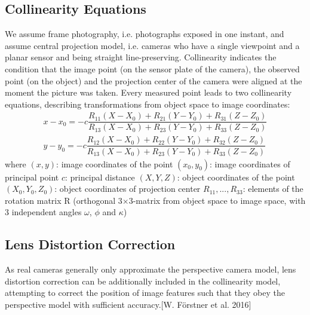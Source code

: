 \subsection{Collinearity Equations}
\label{subsec:Collinearity}
We assume frame photography, i.e. photographs exposed in one instant, and assume central projection model, i.e. cameras who have a single viewpoint and a planar sensor and being straight line-preserving. Collinearity indicates the condition that the image point (on the sensor plate of the camera), the observed point (on the object) and the projection center of the camera were aligned at the moment the picture was taken. Every measured point leads to two collinearity equations, describing transformations from object space to image coordinates:
\begin{equation} \label{eq:collinearity}
\begin{split}
x - x_0 = -c \dfrac {R_{11}(X-X_0) + R_{21}(Y-Y_0) + R_{31}(Z-Z_0)} {R_{13}(X-X_0) + R_{23}(Y-Y_0) + R_{33}(Z-Z_0)} \\
y - y_0 = -c \dfrac {R_{12}(X-X_0) + R_{22}(Y-Y_0) + R_{32}(Z-Z_0)} {R_{13}(X-X_0) + R_{23}(Y-Y_0) + R_{33}(Z-Z_0)}
\end{split}
\end{equation}
where\newline
$(x, y)$: image coordinates of the point \newline
$(x_0, y_0)$: image coordinates of principal point \newline
$c$: principal distance \newline
$(X, Y, Z)$: object coordinates of the point \newline
$(X_0, Y_0, Z_0)$: object coordinates of projection center \newline
$R_{11},...,R_{33}$: elements of the rotation matrix R (orthogonal 3$\times$3-matrix from object space to image space, with 3 independent angles $\omega$, $\phi$ and $\kappa$)


\subsection{Lens Distortion Correction}
\label{subsec:LensDistortion}

As real cameras generally only approximate the perspective camera model, lens distortion correction can be additionally included in the collinearity model, attempting to correct the position of image features such that they obey the perspective model with sufficient accuracy.[W. Förstner et al. 2016] 


